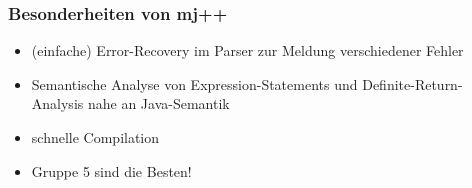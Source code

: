 \begin{frame}
    \frametitle{Besonderheiten von mj++}
    \begin{itemize}
        \item (einfache) Error-Recovery im Parser zur Meldung verschiedener Fehler
        \item Semantische Analyse von Expression-Statements und Definite-Return-Analysis nahe an Java-Semantik
        \item schnelle Compilation
            \pause
        \item Gruppe 5 sind die Besten!
    \end{itemize}
\end{frame}
